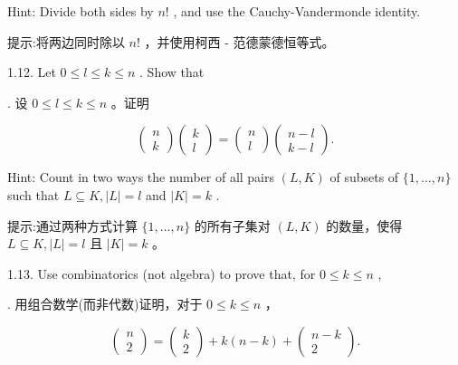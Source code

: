\documentclass[10pt]{article}
\begin{document}
Hint: Divide both sides by \(n!\) , and use the Cauchy-Vandermonde identity.

\begin{tcolorbox}\relax
提示:将两边同时除以 \(n!\) ，并使用柯西 - 范德蒙德恒等式。
\end{tcolorbox}

1.12. Let \(0 \leq  l \leq  k \leq  n\) . Show that

\begin{tcolorbox}. 设 \(0 \leq  l \leq  k \leq  n\) 。证明
\end{tcolorbox}

\[
\left( \begin{array}{l} n \\  k \end{array}\right) \left( \begin{array}{l} k \\  l \end{array}\right)  = \left( \begin{array}{l} n \\  l \end{array}\right) \left( \begin{array}{l} n - l \\  k - l \end{array}\right) .
\]

Hint: Count in two ways the number of all pairs \(\left( {L,K}\right)\) of subsets of \(\{ 1,\ldots ,n\}\) such that \(L \subseteq  K,\left| L\right|  = l\) and \(\left| K\right|  = k\) .

\begin{tcolorbox}\relax
提示:通过两种方式计算 \(\{ 1,\ldots ,n\}\) 的所有子集对 \(\left( {L,K}\right)\) 的数量，使得 \(L \subseteq  K,\left| L\right|  = l\) 且 \(\left| K\right|  = k\) 。
\end{tcolorbox}

1.13. Use combinatorics (not algebra) to prove that, for \(0 \leq  k \leq  n\) ,

\begin{tcolorbox}. 用组合数学(而非代数)证明，对于 \(0 \leq  k \leq  n\) ，
\end{tcolorbox}

\[
\left( \begin{array}{l} n \\  2 \end{array}\right)  = \left( \begin{array}{l} k \\  2 \end{array}\right)  + k\left( {n - k}\right)  + \left( \begin{matrix} n - k \\  2 \end{matrix}\right) .
\]
\end{document}
